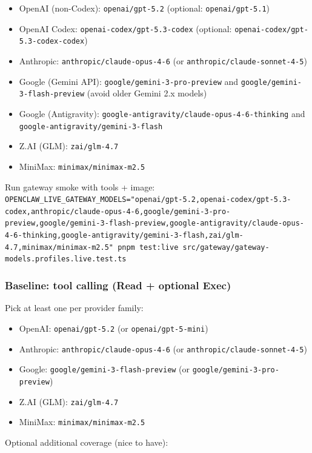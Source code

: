 \begin{itemize}
  \item OpenAI (non-Codex): \texttt{openai/gpt-5.2} (optional: \texttt{openai/gpt-5.1})
  \item OpenAI Codex: \texttt{openai-codex/gpt-5.3-codex} (optional: \texttt{openai-codex/gpt-5.3-codex-codex})
  \item Anthropic: \texttt{anthropic/claude-opus-4-6} (or \texttt{anthropic/claude-sonnet-4-5})
  \item Google (Gemini API): \texttt{google/gemini-3-pro-preview} and \texttt{google/gemini-3-flash-preview} (avoid older Gemini 2.x models)
  \item Google (Antigravity): \texttt{google-antigravity/claude-opus-4-6-thinking} and \texttt{google-antigravity/gemini-3-flash}
  \item Z.AI (GLM): \texttt{zai/glm-4.7}
  \item MiniMax: \texttt{minimax/minimax-m2.5}
\end{itemize}


Run gateway smoke with tools + image:
\texttt{OPENCLAW\_LIVE\_GATEWAY\_MODELS="openai/gpt-5.2,openai-codex/gpt-5.3-codex,anthropic/claude-opus-4-6,google/gemini-3-pro-preview,google/gemini-3-flash-preview,google-antigravity/claude-opus-4-6-thinking,google-antigravity/gemini-3-flash,zai/glm-4.7,minimax/minimax-m2.5" pnpm test:live src/gateway/gateway-models.profiles.live.test.ts}

\subsubsection{Baseline: tool calling (Read + optional Exec)}


Pick at least one per provider family:

\begin{itemize}
  \item OpenAI: \texttt{openai/gpt-5.2} (or \texttt{openai/gpt-5-mini})
  \item Anthropic: \texttt{anthropic/claude-opus-4-6} (or \texttt{anthropic/claude-sonnet-4-5})
  \item Google: \texttt{google/gemini-3-flash-preview} (or \texttt{google/gemini-3-pro-preview})
  \item Z.AI (GLM): \texttt{zai/glm-4.7}
  \item MiniMax: \texttt{minimax/minimax-m2.5}
\end{itemize}


Optional additional coverage (nice to have):

